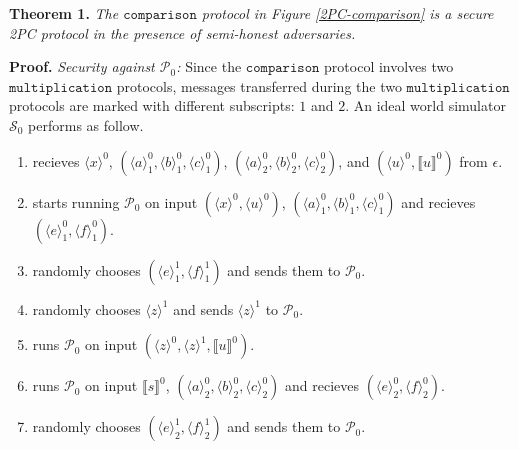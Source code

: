 \documentclass[letterpaper]{article} %
\begin{document}
    \textbf{Theorem 1.}
    \emph{The $\mathtt{comparison}$ protocol in Figure \ref{2PC-comparison} is a secure 2PC protocol
    in the presence of semi-honest adversaries.}

    \textbf{Proof.}
    \emph{Security against $\mathcal{P}_{0}$:}
    Since the $\mathtt{comparison}$ protocol involves two $\mathtt{multiplication}$ protocols,
    messages transferred during the two $\mathtt{multiplication}$ protocols
    are marked with different subscripts: $1$ and $2$.
    An ideal world simulator $\mathcal{S}_{0}$ performs as follow.

    \begin{enumerate}
        \item recieves $\langle x\rangle ^{0}$,
        $(\langle a\rangle_{1}^{0},\langle b\rangle_{1}^{0},\langle c\rangle_{1}^{0})$,
        $(\langle a\rangle_{2}^{0},\langle b\rangle_{2}^{0},\langle c\rangle_{2}^{0})$,
        and $(\langle u\rangle ^{0},\llbracket u \rrbracket ^{0})$
        from $\epsilon $.

        \item starts running $\mathcal{P}_{0}$ on input $(\langle x\rangle ^{0},\langle u\rangle ^{0})$,
        $(\langle a\rangle_{1}^{0},\langle b\rangle_{1}^{0},\langle c\rangle_{1}^{0})$
        and recieves $(\langle e\rangle_{1}^{0},\langle f\rangle_{1}^{0})$.

        \item randomly chooses $(\langle e\rangle_{1}^{1},\langle f\rangle_{1}^{1})$ and sends them to $\mathcal{P}_{0}$.

        \item randomly chooses $\langle z\rangle ^{1}$ and sends $\langle z\rangle ^{1}$ to $\mathcal{P}_{0}$.

        \item runs $\mathcal{P}_{0}$ on input $(\langle z\rangle ^{0},\langle z\rangle ^{1},\llbracket u \rrbracket ^{0})$.

        \item runs $\mathcal{P}_{0}$ on input $\llbracket s \rrbracket^{0}$,
        $(\langle a\rangle_{2}^{0},\langle b\rangle_{2}^{0},\langle c\rangle_{2}^{0})$
        and recieves $(\langle e\rangle_{2}^{0},\langle f\rangle_{2}^{0})$.

        \item randomly chooses $(\langle e\rangle_{2}^{1},\langle f\rangle_{2}^{1})$ and sends them to $\mathcal{P}_{0}$.

    \end{enumerate}
\end{document}
